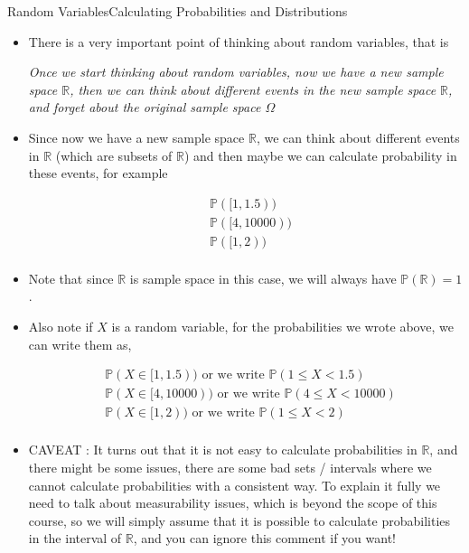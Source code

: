 \documentclass[8pt, usepdftitle=false]{beamer}
\begin{document}
\begin{frame}[allowframebreaks]{Random Variables}{Calculating Probabilities and Distributions}

\begin{itemize}


\item There is a very important point of thinking about random variables, that is


\vspace*{.2cm}
\emph{Once we start thinking about random variables, now we have a \alert{new sample space $\mathbb{R}$}, then we can think about \alert{different events in the new sample space $\mathbb{R}$}, and forget about the original sample space $\Omega$}
\vspace*{.2cm}


\item Since now we have a new sample space $\mathbb{R}$, we can think about different events in $\mathbb{R}$ (which are subsets of $\mathbb{R}$) and then maybe we can calculate probability in these events, for example 

\begin{align*}
	&\mathbb{P}([1, 1.5)) \\
	&\mathbb{P}([4, 10000)) \\
	&\mathbb{P}(  [1, 2)) \\
\end{align*}


\item Note that since $\mathbb{R}$ is sample space in this case, we will always have $\mathbb{P}(\mathbb{R}) = 1$. 


\item Also note if $X$ is a random variable, for the probabilities we wrote above, we can write them as,


\begin{align*}
	&\mathbb{P}(X \in [1, 1.5)) \text{ or we write } \mathbb{P}( 1 \leq X <  1.5)\\
	&\mathbb{P}(X \in [4, 10000)) \text{ or we write } \mathbb{P}( 4 \leq X <  10000)\\
	&\mathbb{P}(X \in [1, 2)) \text{ or we write } \mathbb{P}( 1 \leq X <  2)\\
\end{align*}


\framebreak

\item \alert{CAVEAT \faMugHot :} It turns out that it is not easy to calculate probabilities in $\mathbb{R}$, and there might be some issues, there are some bad sets / intervals where we cannot calculate probabilities with a consistent way. To explain it fully we need to talk about measurability issues, which is beyond the scope of this course, so we will simply assume that it is possible to calculate probabilities in the interval of $\mathbb{R}$, and you can ignore this comment if you want!



\end{itemize}
\end{frame}
\end{document}
